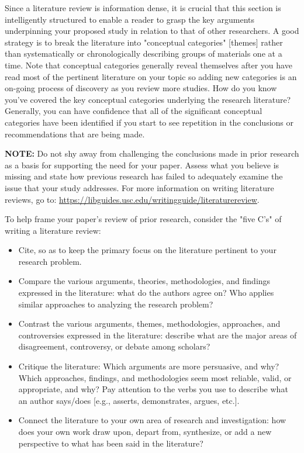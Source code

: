 \documentclass[10pt,twocolumn,letterpaper]{article}
\begin{document}
Since a literature review is information dense, it is crucial that this section is intelligently structured to enable a reader to grasp the key arguments underpinning your proposed study in relation to that of other researchers. A good strategy is to break the literature into "conceptual categories" [themes] rather than systematically or chronologically describing groups of materials one at a time. Note that conceptual categories generally reveal themselves after you have read most of the pertinent literature on your topic so adding new categories is an on-going process of discovery as you review more studies. How do you know you've covered the key conceptual categories underlying the research literature? Generally, you can have confidence that all of the significant conceptual categories have been identified if you start to see repetition in the conclusions or recommendations that are being made.

\textbf{NOTE:} Do not shy away from challenging the conclusions made in prior research as a basis for supporting the need for your paper. Assess what you believe is missing and state how previous research has failed to adequately examine the issue that your study addresses. For more information on writing literature reviews, go to: \url{https://libguides.usc.edu/writingguide/literaturereview}.

To help frame your paper's review of prior research, consider the "five C’s" of writing a literature review:
\begin{itemize}
    \item Cite, so as to keep the primary focus on the literature pertinent to your research problem.
    \item Compare the various arguments, theories, methodologies, and findings expressed in the literature: what do the authors agree on? Who applies similar approaches to analyzing the research problem?
    \item Contrast the various arguments, themes, methodologies, approaches, and controversies expressed in the literature: describe what are the major areas of disagreement, controversy, or debate among scholars?
    \item Critique the literature: Which arguments are more persuasive, and why? Which approaches, findings, and methodologies seem most reliable, valid, or appropriate, and why? Pay attention to the verbs you use to describe what an author says/does [e.g., asserts, demonstrates, argues, etc.].
    \item Connect the literature to your own area of research and investigation: how does your own work draw upon, depart from, synthesize, or add a new perspective to what has been said in the literature?
\end{itemize}
    
\end{document}
